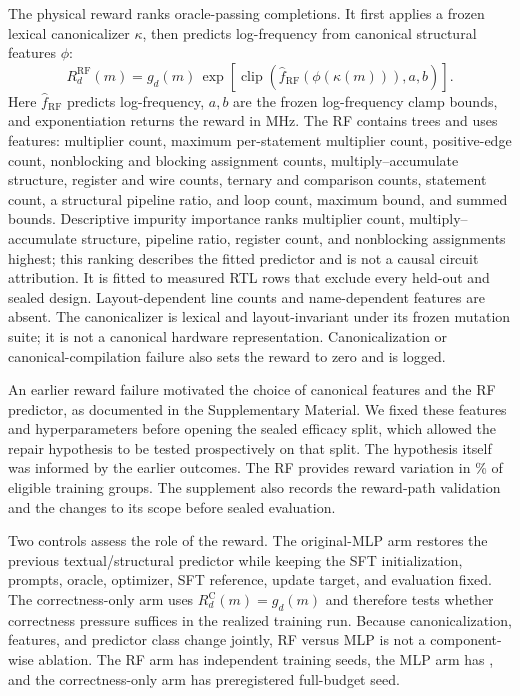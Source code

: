 The physical reward ranks oracle-passing completions. It first applies a frozen
lexical canonicalizer $\kappa$, then predicts log-frequency from canonical structural
features $\phi$:
\begin{equation}
R_d^{\mathrm{RF}}(m)=g_d(m)\,
\exp\!\left[\operatorname{clip}\!\left(
\widehat{f}_{\mathrm{RF}}(\phi(\kappa(m))),a,b\right)\right].
\label{eq:rf-reward}
\end{equation}
Here $\widehat{f}_{\mathrm{RF}}$ predicts log-frequency, $a,b$ are the frozen
log-frequency clamp bounds, and exponentiation returns the reward in MHz.
The RF contains  trees and uses
 features: multiplier count, maximum
per-statement multiplier count, positive-edge count, nonblocking and blocking
assignment counts, multiply--accumulate structure, register and wire counts,
ternary and comparison counts, statement count, a structural pipeline ratio,
and loop count, maximum bound, and summed bounds.  Descriptive impurity
importance ranks multiplier count, multiply--accumulate structure, pipeline
ratio, register count, and nonblocking assignments highest; this ranking
describes the fitted predictor and is not a causal circuit attribution.  It is fitted to
 measured RTL rows that exclude every
held-out and sealed design.  Layout-dependent line counts and name-dependent
features are absent.  The canonicalizer is lexical and layout-invariant under
its frozen mutation suite; it is not a canonical hardware representation.
Canonicalization or canonical-compilation failure also sets the reward to zero
and is logged.

An earlier reward failure motivated the choice of canonical features and the
RF predictor, as documented in the Supplementary Material. We fixed these
features and hyperparameters before opening the sealed efficacy split, which
allowed the repair hypothesis to be tested prospectively on that split.
The hypothesis itself was informed by the earlier outcomes. The RF provides
reward variation in \% of eligible
training groups. The supplement also records the reward-path validation and the
changes to its scope before sealed evaluation.

Two controls assess the role of the reward. The original-MLP arm restores the
previous textual/structural predictor while keeping the SFT initialization,
prompts, oracle, optimizer, SFT reference, update target, and evaluation fixed.
The correctness-only arm uses $R_d^{\mathrm{C}}(m)=g_d(m)$ and therefore tests
whether correctness pressure suffices in the realized training run.  Because
canonicalization, features, and predictor class change jointly, RF versus MLP
is not a component-wise ablation.  The RF arm
has  independent training seeds, the MLP
arm has , and the correctness-only arm has
 preregistered full-budget seed.

